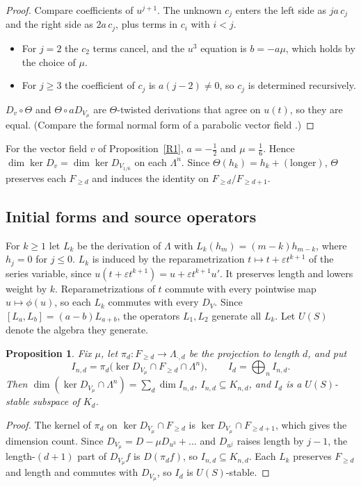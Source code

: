 \documentclass[11pt]{article}
\newtheorem{proposition}[theorem]{Proposition}
\theoremstyle{definition}
\theoremstyle{remark}
\newcommand{\La}{\Lambda}
\begin{document}
\begin{proof}
Compare coefficients of $u^{j+1}$. The unknown $c_j$ enters the left side as $ja\,c_j$ and the right side as
$2a\,c_j$, plus terms in $c_i$ with $i<j$.
\begin{itemize}
\item For $j=2$ the $c_2$ terms cancel, and the $u^3$ equation is $b=-a\mu$, which holds by the choice of $\mu$.
\item For $j\ge3$ the coefficient of $c_j$ is $a(j-2)\ne0$, so $c_j$ is determined recursively.
\end{itemize}
$D_v\circ\Theta$ and $\Theta\circ aD_{V_\mu}$ are $\Theta$-twisted derivations that agree on $u(t)$, so they are
equal. (Compare the formal normal form of a parabolic vector field \cite{Tak}.)
\end{proof}

For the vector field $v$ of Proposition~\ref{R1}, $a=-\frac12$ and $\mu=\frac16$. Hence
$\dim\ker D_v=\dim\ker D_{V_{1/6}}$ on each $\La^n$. Since $\Theta(h_k)=h_k+(\text{longer})$, $\Theta$ preserves
each $F_{\ge d}$ and induces the identity on $F_{\ge d}/F_{\ge d+1}$.

\subsection{Initial forms and source operators}

For $k\ge1$ let $L_k$ be the derivation of $\La$ with $L_k(h_m)=(m-k)h_{m-k}$, where $h_j=0$ for $j\le0$. $L_k$
is induced by the reparametrization $t\mapsto t+\varepsilon t^{k+1}$ of the series variable, since
$u(t+\varepsilon t^{k+1})=u+\varepsilon t^{k+1}u'$. It preserves length and lowers weight by $k$.
Reparametrizations of $t$ commute with every pointwise map $u\mapsto\phi(u)$, so each $L_k$ commutes with every
$D_V$. Since $[L_a,L_b]=(a-b)L_{a+b}$, the operators $L_1,L_2$ generate all $L_k$. Let $U(S)$ denote the algebra
they generate.

\begin{proposition}\label{initial}
Fix $\mu$, let $\pi_d\colon F_{\ge d}\to\La_{\cdot,d}$ be the projection to length $d$, and put
\[
  I_{n,d}=\pi_d\bigl(\ker D_{V_\mu}\cap F_{\ge d}\cap\La^n\bigr),\qquad I_d=\textstyle\bigoplus_nI_{n,d}.
\]
Then $\dim(\ker D_{V_\mu}\cap\La^n)=\sum_d\dim I_{n,d}$, $I_{n,d}\subseteq K_{n,d}$, and $I_d$ is a $U(S)$-stable
subspace of $K_d$.
\end{proposition}

\begin{proof}
The kernel of $\pi_d$ on $\ker D_{V_\mu}\cap F_{\ge d}$ is $\ker D_{V_\mu}\cap F_{\ge d+1}$, which gives the
dimension count. Since $D_{V_\mu}=D-\mu D_{u^3}+\dots$ and $D_{u^j}$ raises length by $j-1$, the length-$(d+1)$
part of $D_{V_\mu}f$ is $D(\pi_df)$, so $I_{n,d}\subseteq K_{n,d}$. Each $L_k$ preserves $F_{\ge d}$ and length
and commutes with $D_{V_\mu}$, so $I_d$ is $U(S)$-stable.
\end{proof}
\end{document}
